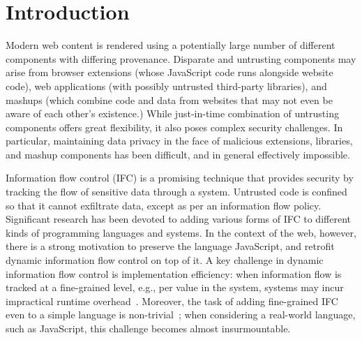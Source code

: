 \section{Introduction}
\label{sec:intro}

Modern web content is rendered using a potentially large number of
different components with differing provenance.
Disparate and untrusting components may arise from browser
extensions (whose JavaScript code runs alongside website
code), web applications (with possibly untrusted third-party
libraries), and mashups (which combine code and data from
websites that may not even be aware of each other's existence.)
While just-in-time combination of untrusting components
offers great flexibility, it also poses complex security challenges.
In particular, maintaining data privacy in the face of malicious
extensions, libraries, and mashup components has been difficult,
and in general effectively impossible.

Information flow control (IFC) is a promising technique
that provides security
by tracking the flow of sensitive data through a system.
Untrusted code is confined so that it cannot exfiltrate data, except as
per an information flow policy.  Significant research has been devoted to
adding various forms of IFC to different kinds of programming languages
and systems.  In the context of the web, however, there is a strong
motivation to preserve the language JavaScript, and retrofit dynamic information
flow control on top of it.  A key challenge in dynamic information
flow control is implementation efficiency: when
information flow is tracked at a fine-grained level,
e.g., per value in the system, systems may incur
impractical runtime overhead~\cite{JSFlow}.
%
Moreover, the task of adding fine-grained IFC even to a simple language is
non-trivial~\cite{hritcu2013testing}; when considering a real-world language,
such as JavaScript, this challenge becomes almost insurmountable.


